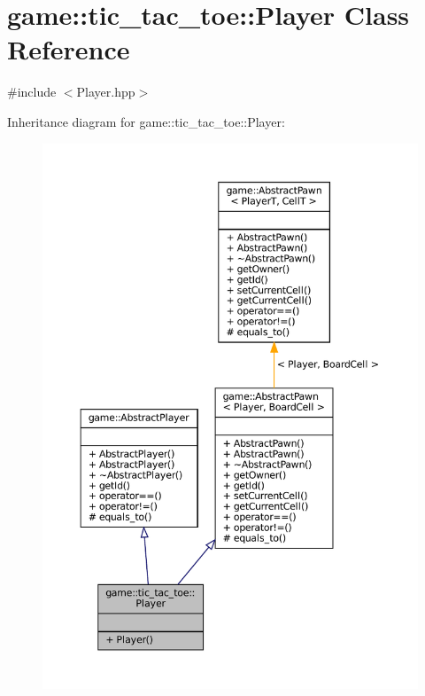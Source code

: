 \hypertarget{classgame_1_1tic__tac__toe_1_1_player}{}\section{game\+:\+:tic\+\_\+tac\+\_\+toe\+:\+:Player Class Reference}
\label{classgame_1_1tic__tac__toe_1_1_player}


{\ttfamily \#include $<$Player.\+hpp$>$}



Inheritance diagram for game\+:\+:tic\+\_\+tac\+\_\+toe\+:\+:Player\+:
\nopagebreak
\begin{figure}[H]
\begin{center}
\leavevmode
\includegraphics[width=350pt]{classgame_1_1tic__tac__toe_1_1_player__inherit__graph}
\end{center}
\end{figure}


